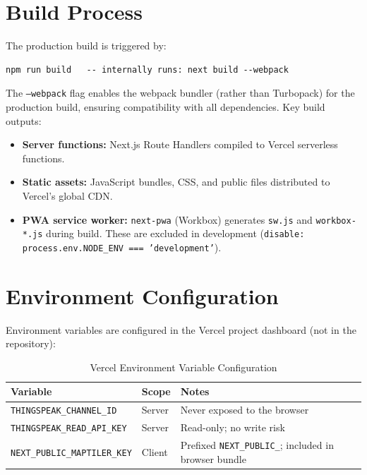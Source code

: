 \section{Build Process}

The production build is triggered by:
\begin{lstlisting}[language={},caption={Build command}]
npm run build   -- internally runs: next build --webpack
\end{lstlisting}

The \texttt{--webpack} flag enables the webpack bundler (rather than Turbopack) for the production build, ensuring compatibility with all dependencies. Key build outputs:

\begin{itemize}[leftmargin=1.5em]
  \item \textbf{Server functions:} Next.js Route Handlers compiled to Vercel serverless functions.
  \item \textbf{Static assets:} JavaScript bundles, CSS, and public files distributed to Vercel's global CDN.
  \item \textbf{PWA service worker:} \texttt{next-pwa} (Workbox) generates \texttt{sw.\allowbreak{}js} and \texttt{workbox-*.\allowbreak{}js} during build. These are excluded in development (\texttt{disable: process.\allowbreak{}env.\allowbreak{}NODE\_\allowbreak{}ENV === 'development'}).
\end{itemize}

\section{Environment Configuration}

Environment variables are configured in the Vercel project dashboard (not in the repository):

\begin{table}[H]
\centering
\caption{Vercel Environment Variable Configuration}
\begin{tabularx}{\linewidth}{|l|l|X|}
\hline
\rowcolor{FloodLight}
\textbf{Variable} & \textbf{Scope} & \textbf{Notes} \\
\hline
\texttt{THINGSPEAK\_\allowbreak{}CHANNEL\_\allowbreak{}ID} & Server & Never exposed to the browser \\
\texttt{THINGSPEAK\_\allowbreak{}READ\_\allowbreak{}API\_\allowbreak{}KEY} & Server & Read-only; no write risk \\
\texttt{NEXT\_\allowbreak{}PUBLIC\_\allowbreak{}MAPTILER\_\allowbreak{}KEY} & Client & Prefixed \texttt{NEXT\_\allowbreak{}PUBLIC\_\allowbreak{}}; included in browser bundle \\
\hline
\end{tabularx}
\end{table}


